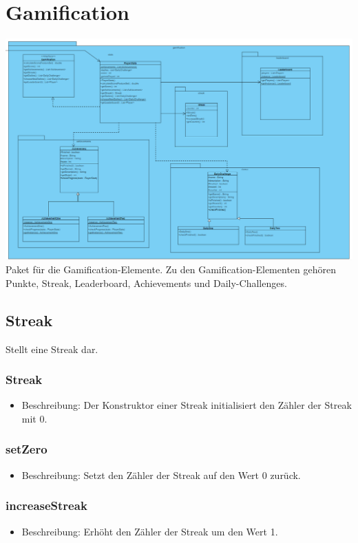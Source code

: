 \documentclass[a4paper]{scrreprt}
\begin{document}
    
   \section{Gamification}
    \includegraphics[width=\textwidth]{img/Gamification.PNG}
   Paket für die Gamification-Elemente. Zu den Gamification-Elementen gehören Punkte, Streak, Leaderboard, Achievements und Daily-Challenges.
   
   
   \subsection{Streak}
   Stellt eine Streak dar.
   
   \subsubsection{Streak}
   \begin{itemize}
   	  \item Beschreibung: Der Konstruktor einer Streak initialisiert den Zähler der Streak mit 0.
   \end{itemize}
   \subsubsection{setZero}
   \begin{itemize}
   	\item Beschreibung: Setzt den Zähler der Streak auf den Wert 0 zurück.
   \end{itemize}
   \subsubsection{increaseStreak}
   \begin{itemize}
   	\item Beschreibung: Erhöht den Zähler der Streak um den Wert 1.
   \end{itemize}
\end{document}
